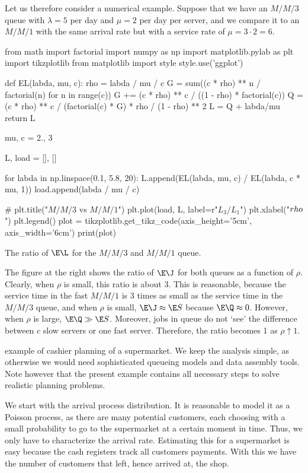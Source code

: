 Let us therefore consider a numerical example.
Suppose that we have an $M/M/3$ queue with $\lambda = 5$ per day and $\mu=2$ per day per server, and we compare it to an $M/M/1$ with the same arrival rate but with a service rate of $\mu = 3\cdot 2 = 6$.
\begin{marginfigure}
\begin{pycode}[ratio]
from math import factorial
import numpy as np
import matplotlib.pylab as plt
import tikzplotlib
from matplotlib import style
style.use('ggplot')


def EL(labda, mu, c):
    rho = labda / mu / c
    G = sum((c * rho) ** n / factorial(n) for n in range(c))
    G += (c * rho) ** c / ((1 - rho) * factorial(c))
    Q = (c * rho) ** c / (factorial(c) * G) * rho / (1 - rho) ** 2
    L = Q + labda/mu
    return L


mu, c = 2., 3

L, load = [], []

for labda in np.linspace(0.1, 5.8, 20):
    L.append(EL(labda, mu, c) / EL(labda, c * mu, 1))
    load.append(labda / mu / c)

# plt.title("$M/M/3$ vs $M/M/1$")
plt.plot(load, L, label=r"$L_3/L_1$")
plt.xlabel("$\\rho$")
plt.legend()
plot = tikzplotlib.get_tikz_code(axis_height='5cm',
                                 axis_width='6cm')
print(plot)
\end{pycode}
\caption{The ratio of $\E\L$ for the $M/M/3$ and $M/M/1$ queue.}
\label{fig:fast}
\end{marginfigure}

The figure at the right shows the ratio of $\E\J$ for both queues as a function of $\rho$.
Clearly, when $\rho$ is small, this ratio is about $3$.
This is reasonable, because the service time in the fast $M/M/1$ is 3 times as small as the service time in the $M/M/3$ queue, and when $\rho$ is small, $\E\J \approx \E S$ because $\E\Q \approx 0$.
However, when $\rho$ is large, $\E\Q \gg \E S$.
Moreover, jobs in queue do not `see' the difference between $c$ slow servers or one fast server. Therefore, the ratio becomes 1 as $\rho\uparrow 1$.


 example of cashier planning of a supermarket.
We keep the analysis simple, as otherwise we would need sophisticated queueing models and data assembly tools.
Note however that the present example contains all  necessary steps to solve realistic planning problems.


We start with the arrival process distribution.
It is reasonable to model it as a Poisson process, as there are many potential customers, each choosing with a small probability to go to the supermarket at a certain moment in time.
Thus, we only have to characterize the arrival rate.
Estimating this for a supermarket is easy because the cash registers track all customers payments.
With this we have the number of customers that left, hence arrived at, the shop.

